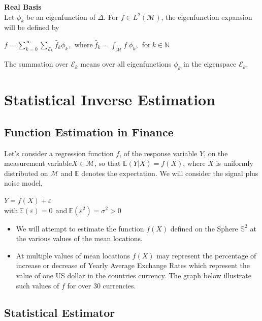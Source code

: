 \documentclass[a0,landscape]{a0poster}
\begin{document}
\begin{multicols}{4}
 \bigskip

\noindent \textbullet \textbf{Real Basis }\\
Let $\phi_{k}$ be an eigenfunction of $\Delta$. For $f \in L^2 (\mathcal{M})$, the eigenfunction expansion will be defined by
\begin{center}
$f = \sum_{k=0}^{\infty}\sum_{\mathcal{E}_{k}} \hat{f}_{k} \phi_{k},~~\text{where}~\hat{f}_{k}= \int_{\mathcal{M}} f~ {\phi}_k , ~~\text{for}~k \in \mathbb{N}$
\end{center}
The summation over $\mathcal{E}_k$ means over all eigenfunctions $\phi_k$ in the eigenspace $\mathcal{E}_k$.


\section*{\color{red} Statistical Inverse Estimation}

\subsection*{\color{blue} Function Estimation in Finance}
Let's consider  a regression function $f$, of the response variable $Y$, on the measurement variable$X \in \mathcal{M}$, so that $\mathbb{E}( Y| X)= f(X)$, where $X$ is uniformly distributed on $\mathcal{M}$ and $\mathbb{E}$ denotes the expectation. We will consider the signal plus noise model,
\begin{center}
$Y= f(X) + \varepsilon $\\
$\text{with} ~\mathbb{E}(\varepsilon) = 0 ~~\text{and}~\mathbb{E}(\varepsilon^2)= \sigma^2 >0 $
\end{center}


\begin{itemize}
\item We will attempt to estimate the function $f(X)$ defined on the Sphere $\mathbb{S}^2$ at the various values of the mean locations.
\item At multiple values of mean locations $f(X)$ may represent the percentage of increase or decrease of Yearly Average Exchange Rates which represent the value of one US dollar in the countries currency. The graph below illustrate such values of $f$ for over 30 currencies.
\end{itemize}
\begin{center}
\end{center}

\subsection*{\color{blue}Statistical Estimator}


\end{multicols}
\end{document}
